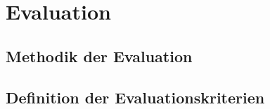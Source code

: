 \section{Evaluation}

\subsection{Methodik der Evaluation}

\subsection{Definition der Evaluationskriterien}
